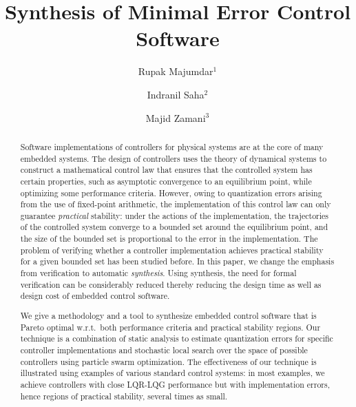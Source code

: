 \documentclass{amsart}
\numberwithin{equation}{section}
\begin{document}
\begin{abstract}
Software implementations of controllers for physical systems are at the core of many embedded systems.
The design of controllers uses the theory of dynamical systems to construct a 
mathematical control law that ensures that the controlled system has certain properties, 
such as asymptotic convergence to an equilibrium point, while optimizing some performance criteria.
However, owing to quantization errors arising from the use of fixed-point arithmetic,
the implementation of this control law can only guarantee
{\em practical} stability: under the actions of the implementation, the trajectories
of the controlled system converge to a bounded set around the equilibrium point, and the
size of the bounded set is proportional to the error in the implementation.
The problem of verifying whether a controller implementation achieves practical stability
for a given bounded set has been studied before.
In this paper, we change the emphasis from verification to automatic {\em synthesis}. 
Using synthesis, the need for formal verification can be considerably reduced thereby reducing 
the design time as well as design cost of embedded control software. 

We give a methodology and a tool to synthesize embedded control 
software that is Pareto optimal
w.r.t.\ both performance criteria and practical stability regions.
Our technique is a combination of static analysis to estimate quantization 
errors for specific controller implementations
and stochastic local search over the space of possible controllers using particle swarm optimization.
The effectiveness of our technique is illustrated using examples of
various standard control systems: 
in most examples, we achieve controllers with close
LQR-LQG performance but with implementation errors, hence regions of practical stability, 
several times as small.
\end{abstract}


\title[Synthesis of Minimal Error Control Software]{Synthesis of Minimal Error Control Software}


\author[Rupak Majumdar]{Rupak Majumdar$^1$} 
\author[Indranil Saha]{Indranil Saha$^2$} 
\author[Majid Zamani]{Majid Zamani$^3$}
\address{$^1$Max Planck Institute for Software Systems\\
Kaiserslautern, Germany}
\address{$^2$Department of Computer Science\\
University of California at Los Angeles,
Los Angeles, CA 90095}
\address{$^3$Department of Electrical Engineering\\
University of California at Los Angeles,
Los Angeles, CA 90095}
\end{document}
